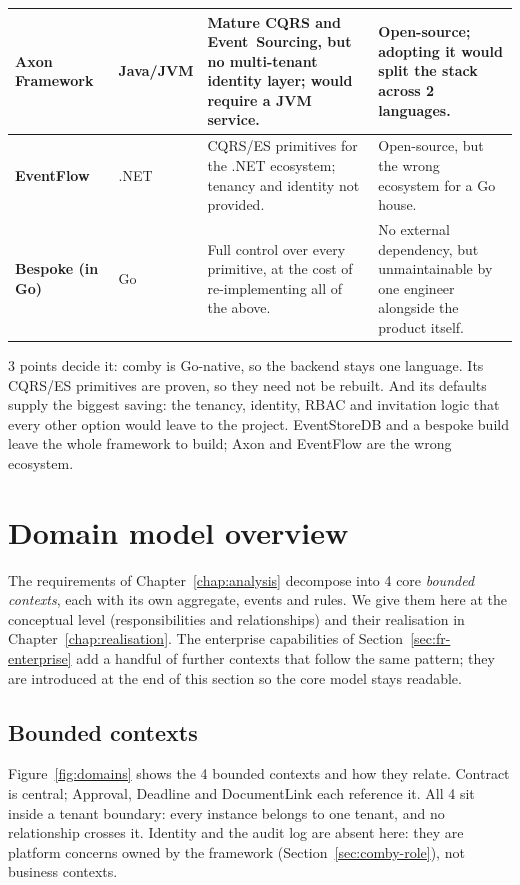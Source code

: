 \begin{spacing}{1.2}
{\begin{xltabular}{\linewidth}{|>{\bfseries}l|l|X|X|}
    \hline
    Axon Framework~\cite{AxonFramework} & Java/JVM & Mature CQRS and
      Event~Sourcing, but no
      multi-tenant identity layer; would require a JVM service. &
      Open-source; adopting it would split the stack across 2 languages.
      \\
    \hline
    EventFlow~\cite{EventFlow} & .NET & CQRS/ES primitives for the .NET
      ecosystem; tenancy
      and identity not provided. & Open-source, but the wrong ecosystem
      for a Go house. \\
    \hline
    Bespoke (in Go) & Go & Full control over every primitive, at the cost
      of re-implementing all of the above. & No external dependency, but
      unmaintainable by one engineer alongside the product itself. \\
    \hline
  \end{xltabular}}

3 points decide it: comby is Go-native, so the backend stays one
language. Its CQRS/ES primitives are proven, so they need not be rebuilt.
And its defaults supply the biggest saving: the tenancy, identity, RBAC
and invitation logic that every other option would leave to the project.
EventStoreDB and a bespoke build leave the whole framework to build; Axon
and EventFlow are the wrong ecosystem.

\section{Domain model overview}
\label{sec:domain-model}

The requirements of Chapter~\ref{chap:analysis} decompose into 4 core
\textit{bounded contexts}, each with its own aggregate, events
and rules. We give them here at the conceptual level (responsibilities and
relationships) and their realisation in Chapter~\ref{chap:realisation}.
The enterprise capabilities of Section~\ref{sec:fr-enterprise} add a handful
of further contexts that follow the same pattern; they are introduced at the
end of this section so the core model stays readable.

\subsection{Bounded contexts}
\label{sec:bounded-contexts}

Figure~\ref{fig:domains} shows the 4 bounded contexts and how they
relate. Contract is central; Approval,
Deadline and DocumentLink each reference it. All 4 sit inside a tenant
boundary: every instance belongs to one tenant, and no relationship
crosses it. Identity and the audit log are absent here: they are
platform concerns owned by the framework (Section~\ref{sec:comby-role}), not
business contexts.


\end{spacing}
